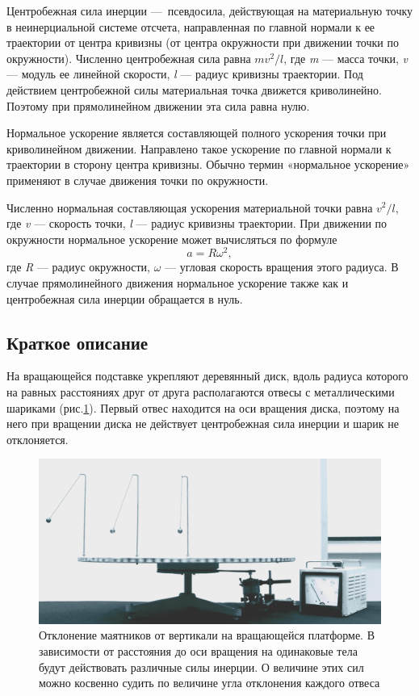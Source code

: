 \documentclass[All.tex]{subfiles}
\begin{document}
		Центробежная сила инерции — псевдосила, действующая на материальную точку в неинерциальной системе отсчета, 
		направленная по главной нормали к ее траектории от центра кривизны 
		(от центра окружности при движении точки по окружности).
		Численно центробежная сила равна $ mv^2/l $, где \textit{m} — масса точки, \textit{v} — модуль ее линейной скорости, \textit{l} — радиус кривизны траектории.
		Под действием центробежной силы материальная точка движется криволинейно. 
		Поэтому при прямолинейном движении эта сила равна нулю.
		
		Нормальное ускорение является составляющей полного ускорения точки при криволинейном движении.
		Направлено такое ускорение по главной нормали к траектории в сторону центра кривизны.
		Обычно термин «нормальное ускорение» применяют в случае движения точки по окружности.
		
		Численно нормальная составляющая ускорения материальной точки равна $ v^2/l $, где \textit{v} — скорость точки, \textit{l} — радиус кривизны траектории.
		При движении по окружности нормальное ускорение может вычисляться по формуле $$ a = R\omega^2, $$ где \textit{R} — радиус окружности, $ \omega $ — угловая скорость вращения этого радиуса. 
		В случае прямолинейного движения нормальное ускорение также как и центробежная сила инерции обращается в нуль.

\subsection*{\textcolor{PineGreen}{Краткое описание}}
			
На вращающейся подставке укрепляют деревянный диск, вдоль радиуса которого на равных расстояниях друг от друга располагаются отвесы с металлическими шариками (рис.\ref{platform-2}).
Первый отвес находится на оси вращения диска, поэтому на него при вращении диска не действует центробежная сила инерции и шарик не отклоняется.

\begin{figure}[H] 
	\centering 		
	\includegraphics[width=0.9\linewidth]{platform-2.png} 
	\caption{Отклонение маятников от вертикали на вращающейся платформе. В зависимости от расстояния до оси вращения на одинаковые тела будут действовать различные силы инерции. О величине этих сил можно косвенно судить по величине угла отклонения каждого отвеса}
	\label{platform-2}
\end{figure}
	
\end{document}

